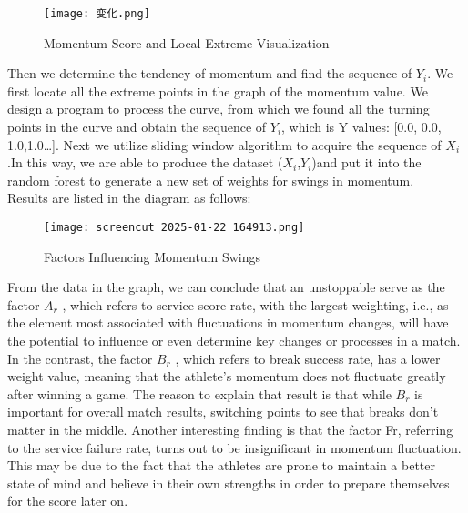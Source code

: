 \documentclass{mcmthesis}
\begin{document}
\begin{figure}[htbp]
    \centering
    \texttt{[image: 变化.png]}
    \caption{Momentum Score and Local Extreme Visualization} \label{Figure 21}
\end{figure}

Then we determine the tendency of momentum and find the sequence of $Y_{i}$. We first locate
all the extreme points in the graph of the momentum value. We design a program to process the
curve, from which we found all the turning points in the curve and obtain the sequence of $Y_{i}$, which is
Y values: [0.0, 0.0, 1.0,1.0…]. Next we utilize sliding window algorithm to acquire the sequence of
$X_{i}$.In this way, we are able to produce the dataset ($X_{i}$,$Y_{i}$)and put it into the random forest to
generate a new set of weights for swings in momentum.\\
Results are listed in the diagram as follows:\\










\begin{figure}[htbp]
    \centering
    \texttt{[image: screencut 2025-01-22 164913.png]}
    \caption{Factors Influencing Momentum Swings} \label{Figure 22}
\end{figure}

From the data in the graph, we can conclude that an unstoppable serve as the factor $A_{r}$
, which
refers to service score rate, with the largest weighting, i.e., as the element most associated with
fluctuations in momentum changes, will have the potential to influence or even determine key
changes or processes in a match. In the contrast, the factor $B_{r}$
, which refers to break success rate, has a lower weight value, meaning that the athlete's momentum does not fluctuate greatly after
winning a game. The reason to explain that result is that while $B_{r}$
is important for overall match
results, switching points to see that breaks don't matter in the middle. Another interesting finding
is that the factor Fr, referring to the service failure rate, turns out to be insignificant in momentum
fluctuation. This may be due to the fact that the athletes are prone to maintain a better state of
mind and believe in their own strengths in order to prepare themselves for the score later on.\\
\end{document}
